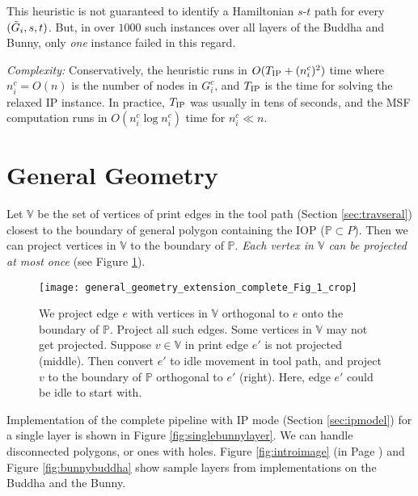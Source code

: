 This heuristic is not guaranteed to identify a Hamiltonian $s$-$t$ path for every $(\tilde{G}_i, s, t)$.
But, in over $1000$ such instances over all layers of the Buddha and Bunny, only \emph{one} instance failed in this regard.

\textit{Complexity:} Conservatively, the heuristic runs in $O(T_{\mbox{\scriptsize IP}} + (n^c_i)^2)$ time where $n^c_i = O(n)$ is the number of nodes in $G_i^c$, and $T_{\mbox{\scriptsize IP}}$ is the time for solving the relaxed IP instance.
In practice, $T_{\mbox{\scriptsize IP}}$ was usually in tens of seconds, and the MSF computation runs in $O(n^c_i \log n^c_i)$ time for $n^c_i \ll n$.
\section{General Geometry}\label{sec:gengeometryextension}

Let $\mathbb{V}$ be the set of vertices of print edges in the tool path (Section \ref{sec:travseral}) closest to the boundary of general polygon containing the IOP ($\mathbb{P} \subset P$).
Then we can project vertices in $\mathbb{V}$ to the boundary of $\mathbb{P}$.
\textit{Each vertex in $\mathbb{V}$ can be projected at most once} (see Figure \ref{fig:gengeomtryext}).

\begin{figure}[htp!] 
  \centering
  \texttt{[image: general\_geometry\_extension\_complete\_Fig\_1\_crop]}
  \caption{\label{fig:gengeomtryext}
    We project edge $e$ with vertices in $\mathbb{V}$ orthogonal to $e$ onto the boundary of $\mathbb{P}$.
    Project all such edges.
    Some vertices in $\mathbb{V}$ may not get projected.
    Suppose $v \in \mathbb{V}$  in print edge $e'$ is not projected (middle).
    Then convert $e'$ to idle movement in tool path, and project $v$ to the boundary of $\mathbb{P}$ orthogonal to $e'$ (right).
    Here, edge $e'$ could be idle to start with.
  }  	
\end{figure}

Implementation of the complete pipeline with IP mode (Section \ref{sec:ipmodel}) for a single layer is shown in Figure \ref{fig:singlebunnylayer}.
We can handle disconnected polygons, or ones with holes.
Figure \ref{fig:introimage} (in Page \pageref{fig:introimage}) and Figure \ref{fig:bunnybuddha} show sample layers from implementations on the Buddha and the Bunny. 

